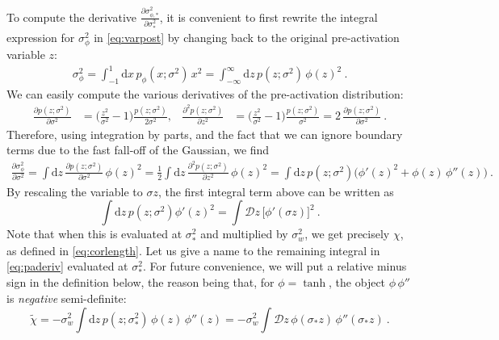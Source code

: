 To compute the derivative $\frac{\partial \sigma_{\phi , *}^{2}}{\partial \sigma_{*}^{2}}$, it is convenient to first rewrite the integral expression for $\sigma_{\phi}^{2}$ in \eqref{eq:varpost} by changing back to the original pre-activation variable $z$:
%
\begin{align}
	\sigma_{\phi}^{2} = \int_{-1}^{1} \mathrm{d} x \, p_{\phi} ( x ; \sigma^2 ) \, x^2 = \int_{- \infty}^{\infty}\mathrm{d} z \, p(z ; \sigma^2 ) \, \phi (z)^2~.
\end{align}
%
We can easily compute the various derivatives of the pre-activation distribution:
%
\begin{align}
	\frac{\partial p(z ; \sigma^2 )}{\partial \sigma^2} &= \biggl( \frac{z^2}{\sigma^2} -1 \biggr) \frac{p(z ; \sigma^2 )}{2 \sigma^2}, &%
	\frac{\partial^2 p(z; \sigma^2 )}{\partial z^2} &= \biggl( \frac{z^2}{\sigma^2} -1 \biggr) \frac{p(z ; \sigma^2 )}{\sigma^2} = 2 \, \frac{\partial p(z ; \sigma^2 )}{\partial \sigma^2}~.
\end{align}
%
Therefore, using integration by parts, and the fact that we can ignore boundary terms due to the fast fall-off of the Gaussian, we find
%
\begin{align} \label{eq:paderiv}
	\frac{\partial \sigma_{\phi}^{2}}{\partial \sigma^2} = \int \mathrm{d} z \, \frac{\partial p (z ; \sigma^2)}{\partial \sigma^2} \, \phi (z)^2 = \frac{1}{2} \int \mathrm{d} z \, \frac{\partial^2 p(z ; \sigma^2 )}{\partial z^2} \, \phi (z)^2 = \int \mathrm{d} z \, p(z ; \sigma^2 ) \bigl( \phi' (z)^2 + \phi(z) \, \phi'' (z) \bigr)~.
\end{align}
%
By rescaling the variable to $\sigma z$, the first integral term above can be written as
%
\begin{equation}
	\int \mathrm{d} z \, p(z; \sigma^2 ) \phi' (z)^2 = \int \mathcal{D} z \, \bigl[ \phi' ( \sigma z ) \bigr]^2~.
\end{equation}
%
Note that when this is evaluated at $\sigma_{*}^{2}$ and multiplied by $\sigma_{w}^{2}$, we get precisely $\chi$, as defined in \eqref{eq:corlength}. Let us give a name to the remaining integral in \eqref{eq:paderiv} evaluated at $\sigma_{*}^{2}$. For future convenience, we will put a relative minus sign in the definition below, the reason being that, for $\phi = \tanh$, the object $\phi \, \phi''$ is \emph{negative} semi-definite:
%
\begin{equation}
	\tilde{\chi} = - \sigma_{w}^{2} \int \mathrm{d} z \, p (z ; \sigma_{*}^{2} ) \, \phi (z) \, \phi '' (z) = - \sigma_{w}^{2} \int \mathcal{D} z \, \phi ( \sigma_* z ) \, \phi '' ( \sigma_* z )~.
\end{equation}
